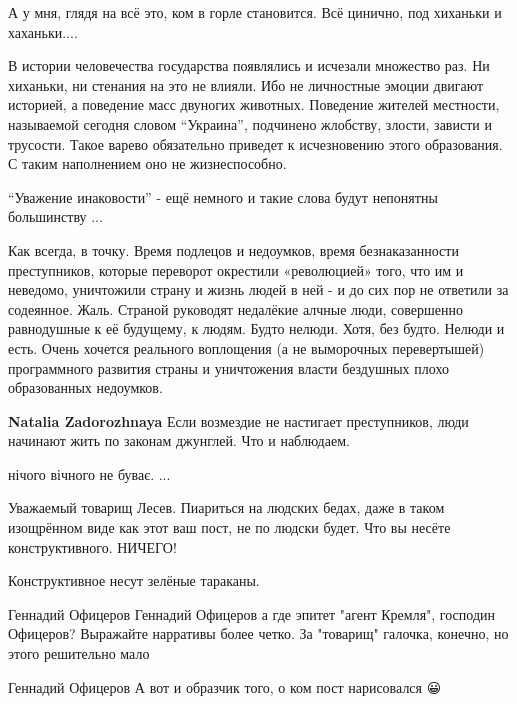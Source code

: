 \begin{itemize}

А у мня, глядя на всё это, ком в горле становится. Всё цинично, под хиханьки и
хаханьки....


В истории человечества государства появлялись и исчезали множество раз. Ни
хиханьки, ни стенания на это не влияли. Ибо не личностные эмоции двигают
историей, а поведение масс двуногих животных. Поведение жителей местности,
называемой сегодня словом \enquote{Украина}, подчинено жлобству, злости, зависти и
трусости. Такое варево обязательно приведет к исчезновению этого образования. С
таким наполнением оно не жизнеспособно.


\enquote{Уважение инаковости} - ещё немного и такие слова будут непонятны большинству ...


Как всегда, в точку. Время подлецов и недоумков, время безнаказанности
преступников, которые переворот окрестили «революцией» того, что им и неведомо,
уничтожили страну и жизнь людей в ней - и до сих пор не ответили за содеянное.
Жаль. Страной руководят недалёкие алчные люди, совершенно равнодушные к её
будущему, к людям. Будто нелюди. Хотя, без будто. Нелюди и есть.  Очень
хочется реального воплощения (а не выморочных перевертышей) программного
развития страны и уничтожения власти бездушных плохо образованных недоумков.

\textbf{Natalia Zadorozhnaya} Если возмездие не настигает преступников, люди
начинают жить по законам джунглей. Что и наблюдаем.

нічого вічного не буває. ...


Уважаемый товарищ Лесев. Пиариться на людских бедах, даже в таком изощрённом
виде как этот ваш пост, не по людски будет. Что вы несёте конструктивного.
НИЧЕГО!

\begin{itemize}
Конструктивное несут зелёные тараканы.

Геннадий Офицеров Геннадий Офицеров а где эпитет "агент Кремля", господин Офицеров? Выражайте нарративы более четко. За "товарищ" галочка, конечно, но этого решительно мало

Геннадий Офицеров А вот и образчик того, о ком пост нарисовался 😀


\end{itemize}
\end{itemize}
